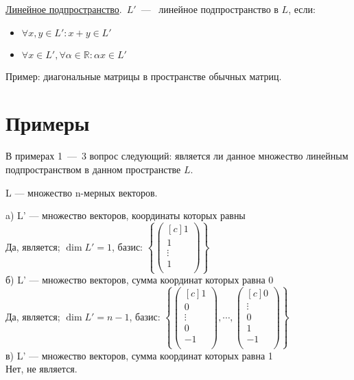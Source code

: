 \begin{definition}
	\underline{Линейное подпространство}.~$L'$~---~ линейное подпространство в $L$, если:
	\begin{itemize}
		\item $\forall x, y \in L': x + y \in L'$ %
		\item $\forall x \in L', \forall \alpha \in \mathbb{R} : \alpha x \in L'$
	\end{itemize}
\end{definition}

Пример: диагональные матрицы в пространстве обычных матриц.
\section{Примеры}
В примерах 1~---~3 вопрос следующий: является ли данное множество линейным подпространством в данном пространстве $L$.
\begin{prim} %
	L --- множество n-мерных векторов. %
\end{prim}
a) L' --- множество векторов, координаты которых равны\\
Да, является;  $\dim L'=1$, базис: %
$\left\{
\begin{pmatrix*}[c] %
1\\ 
1\\ 
\vdots\\
1\\ 
\end{pmatrix*}
\right\}$\\
б) L' --- множество векторов,  сумма координат которых равна 0\\
Да, является;  $\dim  L'=n-1$, базис: 
$
\left\{ %
\begin{pmatrix*}[c] %
1\\ 
0\\ 
\vdots\\ 
0\\ 
-1\\
\end{pmatrix*}
, \cdots ,
\begin{pmatrix*}[c]
0\\ 
\vdots\\ 
0\\ 
1\\ 
-1\\
\end{pmatrix*}
\right\}$\\
в) L' --- множество векторов,  сумма координат которых равна 1\\
Нет, не является.\\

